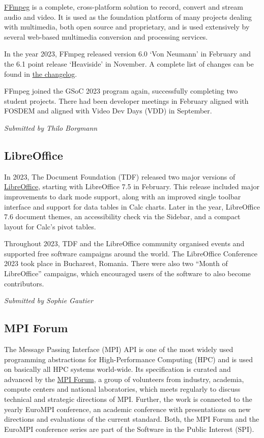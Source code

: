 \documentclass[a4paper]{report}
\begin{document}
\href{https://www.ffmpeg.org/}{FFmpeg} is a complete, cross-platform solution to record, convert and stream audio and video. It is used as the foundation platform of many projects dealing with multimedia, both open source and proprietary, and is used extensively by several web-based multimedia conversion and processing services.

In the year 2023, FFmpeg released version 6.0 `Von Neumann' in February and the 6.1 point release `Heaviside' in November. A complete list of changes can be found in \href{https://git.ffmpeg.org/gitweb/ffmpeg.git/blob/HEAD:/Changelog}{the changelog}.

FFmpeg joined the GSoC 2023 program again, successfully completing two student projects. There had been developer meetings in February aligned with FOSDEM and aligned with Video Dev Days (VDD) in September.

{\em Submitted by Thilo Borgmann}

\subsection{LibreOffice}

In 2023, The Document Foundation (TDF) released two major versions of \href{https://www.libreoffice.org/}{LibreOffice}, starting with LibreOffice 7.5 in February. This release included major improvements to dark mode support, along with an improved single toolbar interface and support for data tables in Calc charts. Later in the year, LibreOffice 7.6 document themes, an accessibility check via the Sidebar, and a compact layout for Calc's pivot tables.

Throughout 2023, TDF and the LibreOffice community organised events and supported free software campaigns around the world. The LibreOffice Conference 2023 took place in Bucharest, Romania. There were also two ``Month of LibreOffice'' campaigns, which encouraged users of the software to also become contributors.

{\em Submitted by Sophie Gautier}

\subsection{MPI Forum}

The Message Passing Interface (MPI) API is one of the most widely used programming abstractions for High-Performance Computing (HPC) and is used on basically all HPC systems world-wide. Its specification is curated and advanced by the \href{https://www.mpi-forum.org/}{MPI Forum}, a group of volunteers from industry, academia, compute centers and national laboratories, which meets regularly to discuss technical and strategic directions of MPI. Further, the work is connected to the yearly EuroMPI conference, an academic conference with presentations on new directions and evaluations of the current standard. Both, the MPI Forum and the EuroMPI conference series are part of the Software in the Public Interest (SPI).
\end{document}
